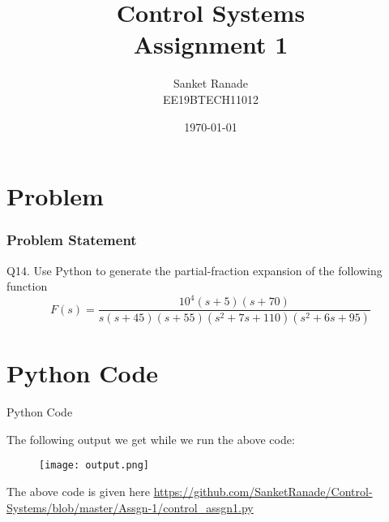 \documentclass{beamer}
\title{Control Systems \\ Assignment 1}
\author{Sanket Ranade\\ EE19BTECH11012}
\date{\today}
\theoremstyle{remark}
\numberwithin{equation}{section}
\begin{document}
\begin{frame}
\titlepage
\end{frame}

\section{Problem}
\begin{frame}
\frametitle{Problem Statement}
Q14. Use Python to generate the partial-fraction expansion of the following function
\begin{equation} 
F(s) = \dfrac{10^4(s+5)(s+70)}{s(s+45)(s+55)(s^2+7s+110)(s^2+6s+95)}
\label{}
\end{equation}
\end{frame}

\section{Python Code}
\begin{frame}{Python Code}

\end{frame}

\begin{frame}
The following output we get while we run the above code:
\begin{figure}
\centering
\texttt{[image: output.png]}
\label{fig:circle_diameter}
\end{figure}
\vspace{10mm}
The above code is given here \url{https://github.com/SanketRanade/Control-Systems/blob/master/Assgn-1/control_assgn1.py}
\end{frame}
\end{document}
